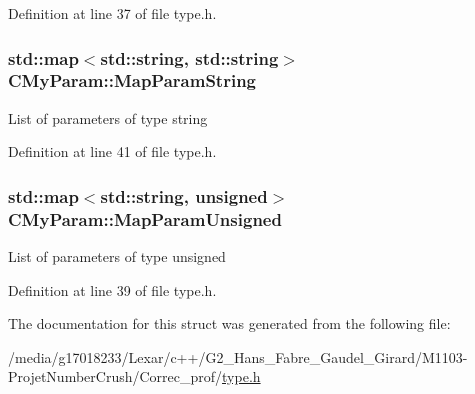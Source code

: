 Definition at line 37 of file type.\+h.

\hypertarget{struct_c_my_param_a6f22660b5eff76608f47c52930e6ecf1}{
\subsubsection[{Map\+Param\+String}]{\setlength{\rightskip}{0pt plus 5cm}std\+::map$<$std\+::string, std\+::string$>$ C\+My\+Param\+::\+Map\+Param\+String}}\label{struct_c_my_param_a6f22660b5eff76608f47c52930e6ecf1}
List of parameters of type string 

Definition at line 41 of file type.\+h.

\hypertarget{struct_c_my_param_aece7d4bdf4103e359f769d08e97a459d}{
\subsubsection[{Map\+Param\+Unsigned}]{\setlength{\rightskip}{0pt plus 5cm}std\+::map$<$std\+::string, unsigned$>$ C\+My\+Param\+::\+Map\+Param\+Unsigned}}\label{struct_c_my_param_aece7d4bdf4103e359f769d08e97a459d}
List of parameters of type unsigned 

Definition at line 39 of file type.\+h.



The documentation for this struct was generated from the following file\+:\begin{DoxyCompactItemize}
\item 
/media/g17018233/\+Lexar/c++/\+G2\+\_\+\+Hans\+\_\+\+Fabre\+\_\+\+Gaudel\+\_\+\+Girard/\+M1103-\/\+Projet\+Number\+Crush/\+Correc\+\_\+prof/\hyperlink{type_8h}{type.\+h}\end{DoxyCompactItemize}
